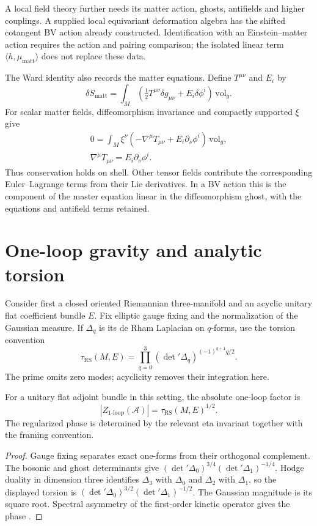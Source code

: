 A local field theory further needs its matter action, ghosts, antifields
and higher couplings. A supplied local equivariant deformation algebra
has the shifted cotangent BV action already constructed. Identification
with an Einstein--matter action requires the action and pairing comparison;
the isolated linear term $\langle h,\mu_{\mathrm{matt}}\rangle$ does not
replace these data.

The Ward identity also records the matter equations. Define $T^{\mu\nu}$
and $E_i$ by
\[
 \delta S_{\mathrm{matt}}
 =\int_M\left(\tfrac12T^{\mu\nu}\delta g_{\mu\nu}
                      +E_i\delta\phi^i\right)\,\mathrm{vol}_g.
\]
For scalar matter fields, diffeomorphism invariance and compactly supported
$\xi$ give
\[
 \begin{gathered}
 0=\int_M\xi^\nu(-\nabla^\mu T_{\mu\nu}
                         +E_i\partial_\nu\phi^i)\,\mathrm{vol}_g,\\
 \nabla^\mu T_{\mu\nu}=E_i\partial_\nu\phi^i.
 \end{gathered}
\]
Thus conservation holds on shell. Other tensor fields contribute the
corresponding Euler--Lagrange terms from their Lie derivatives. In a BV
action this is the component of the master equation linear in the
diffeomorphism ghost, with the equations and antifield terms retained.

\section{One-loop gravity and analytic torsion}
Consider first a closed oriented Riemannian three-manifold and an acyclic
unitary flat coefficient bundle $E$. Fix elliptic gauge fixing and the
normalization of the Gaussian measure. If $\Delta_q$ is its de Rham
Laplacian on $q$-forms, use the torsion convention
\[
 \tau_{\mathrm{RS}}(M,E)
   =\prod_{q=0}^3(\det{}'\Delta_q)^{(-1)^{q+1}q/2}.
\]
The prime omits zero modes; acyclicity removes their integration here.

\begin{proposition}
For a unitary flat adjoint bundle in this setting, the absolute one-loop
factor is
\[
 |Z_{1\text{-loop}}(\mathcal A)|=\tau_{\mathrm{RS}}(M,E)^{1/2}.
\]
The regularized phase is determined by the relevant eta invariant together
with the framing convention.
\end{proposition}
\begin{proof}
Gauge fixing separates exact one-forms from their orthogonal complement.
The bosonic and ghost determinants give
$(\det{}'\Delta_0)^{3/4}(\det{}'\Delta_1)^{-1/4}$.
Hodge duality in dimension three identifies $\Delta_3$ with $\Delta_0$
and $\Delta_2$ with $\Delta_1$, so the displayed torsion is
$(\det{}'\Delta_0)^{3/2}(\det{}'\Delta_1)^{-1/2}$.
The Gaussian magnitude is its square root. Spectral asymmetry of the
first-order kinetic operator gives the phase
\cite{RaySinger1971,WittenJones}.
\end{proof}

